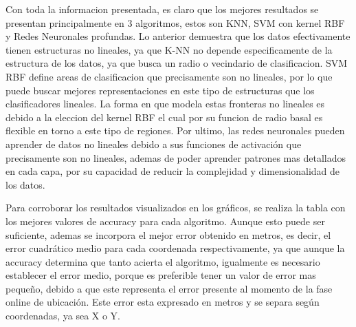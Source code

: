 Con toda la informacion presentada, es claro que los mejores resultados se presentan principalmente en 3 algoritmos, estos son KNN, SVM con kernel RBF y Redes Neuronales profundas. Lo anterior demuestra que los datos efectivamente tienen estructuras no lineales, ya que K-NN no depende especificamente de la estructura de los datos, ya que busca un radio o vecindario de clasificacion. SVM RBF define areas de clasificacion que precisamente son no lineales, por lo que puede buscar mejores representaciones en este tipo de estructuras que los clasificadores lineales. La forma en que modela estas fronteras no lineales es debido a la eleccion del kernel RBF el cual por su funcion de radio basal es flexible en torno a este tipo de regiones. Por ultimo, las redes neuronales pueden aprender de datos no lineales debido a sus funciones de activación que precisamente son no lineales, ademas de poder aprender patrones mas detallados en cada capa, por su capacidad de reducir la complejidad y dimensionalidad de los datos.

Para corroborar los resultados visualizados en los gráficos, se realiza la tabla con los mejores valores de accuracy para cada algoritmo. Aunque esto puede ser suficiente, ademas se incorpora el mejor error obtenido en metros, es decir, el error cuadrático medio para cada coordenada respectivamente, ya que aunque la accuracy determina que tanto acierta el algoritmo, igualmente es necesario establecer el error medio, porque es preferible tener un valor de error mas pequeño, debido a que este representa el error presente al momento de la fase online de ubicación. Este error esta expresado en metros y se separa según coordenadas, ya sea X o Y.

